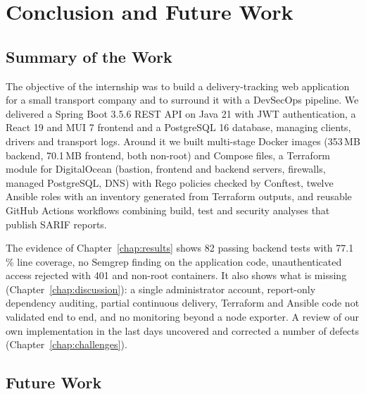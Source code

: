 \chapter{Conclusion and Future Work}
\label{chap:conclusion}

\section{Summary of the Work}

The objective of the internship was to build a delivery-tracking web application for a small transport company and to surround it with a DevSecOps pipeline. We delivered a Spring Boot 3.5.6 REST API on Java 21 with JWT authentication, a React 19 and MUI 7 frontend and a PostgreSQL 16 database, managing clients, drivers and transport logs. Around it we built multi-stage Docker images (353\,MB backend, 70.1\,MB frontend, both non-root) and Compose files, a Terraform module for DigitalOcean (bastion, frontend and backend servers, firewalls, managed PostgreSQL, DNS) with Rego policies checked by Conftest, twelve Ansible roles with an inventory generated from Terraform outputs, and reusable GitHub Actions workflows combining build, test and security analyses that publish SARIF reports.

The evidence of Chapter~\ref{chap:results} shows 82 passing backend tests with 77.1\,\% line coverage, no Semgrep finding on the application code, unauthenticated access rejected with 401 and non-root containers. It also shows what is missing (Chapter~\ref{chap:discussion}): a single administrator account, report-only dependency auditing, partial continuous delivery, Terraform and Ansible code not validated end to end, and no monitoring beyond a node exporter. A review of our own implementation in the last days uncovered and corrected a number of defects (Chapter~\ref{chap:challenges}).

\section{Future Work}


